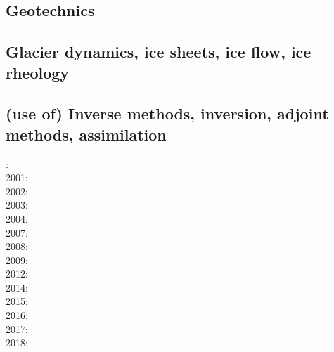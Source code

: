 \subsection{Geotechnics}

{\scriptsize
\noindent
\cite{ster99}
\cite{gora03}
\cite{zhll03}
\cite{gour04}
\cite{gork06}
\cite{bufy14}
}

\subsection{Glacier dynamics, ice sheets, ice flow, ice rheology}

{\scriptsize
\noindent
\cite{wizh94}
\cite{grev97}
\cite{frmm04}
\cite{asbl06}\cite{frmm06}
\cite{susp07}
\cite{zhjg11}
\cite{pode12}
\cite{lejx14}
\cite{issg15}\cite{frlg15}
\cite{krab16}
\cite{lolc17}
}

\subsection{(use of) Inverse methods, inversion, adjoint methods, assimilation}

{\scriptsize
{}: \cite{cava98}\\
2001: \cite{bomo01}\cite{kapo01}\\
2002: \cite{shri02}\\
2003: \cite{buht03}\\
2004: \cite{isst04}\\
2007: \cite{isks07}\\
2008: \cite{splg08}\cite{ligu08}\\
2009: \cite{wama09}\cite{splg09}\cite{sifg09}\\
2012: \cite{naco12}\\
2014: \cite{wosp14}\cite{hobo14}\\
2015: \cite{wahg15}\\
2016: \cite{ghbu16}\cite{bocf16}\\
2017: \cite{ligs17}\\
2018: \cite{bofc18}
}

